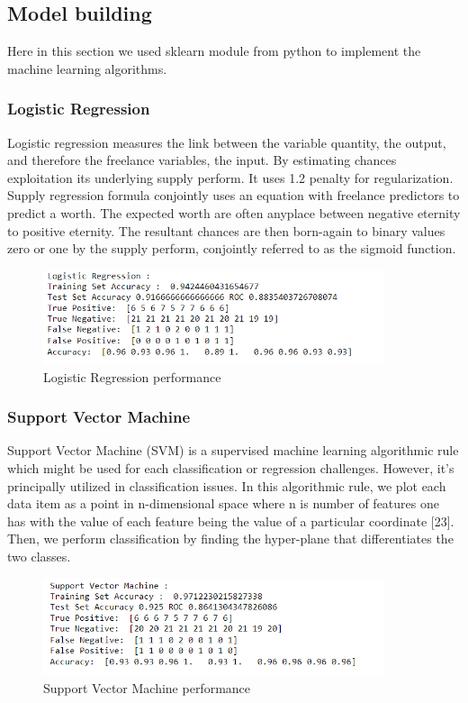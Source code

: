 \documentclass[conference]{IEEEtran}
\begin{document}
\subsection{Model building}
Here in this section we used sklearn module from python to implement the machine learning algorithms.

\subsubsection{Logistic Regression}
Logistic regression measures the link between the variable quantity, the output, and therefore the freelance variables, the input. By estimating chances exploitation its underlying supply perform. It uses 1.2 penalty for regularization. Supply regression formula conjointly uses an equation with freelance predictors to predict a worth. The expected worth are often anyplace between negative eternity to positive eternity. The resultant chances are then born-again to binary values zero or one by the supply perform, conjointly referred to as the sigmoid function.
\begin{figure}[htbp]
\centerline{\includegraphics[width=100mm]{logistic.png}}
\caption{Logistic Regression performance}
\label{fig}
\end{figure}

\subsubsection{ Support Vector Machine}
Support Vector Machine (SVM) is a supervised machine learning algorithmic rule which might be used for each classification or regression challenges. However, it’s principally utilized in classification issues. In this algorithmic rule, we plot each data item as a point in n-dimensional space where n is number of features one has with the value of each feature being the value of a particular coordinate [23]. Then, we perform classification by finding the hyper-plane that differentiates the two classes.
\begin{figure}[htbp]
\centerline{\includegraphics[width=100mm]{svm.png}}
\caption{Support Vector Machine performance}
\label{fig}
\end{figure}
\end{document}
